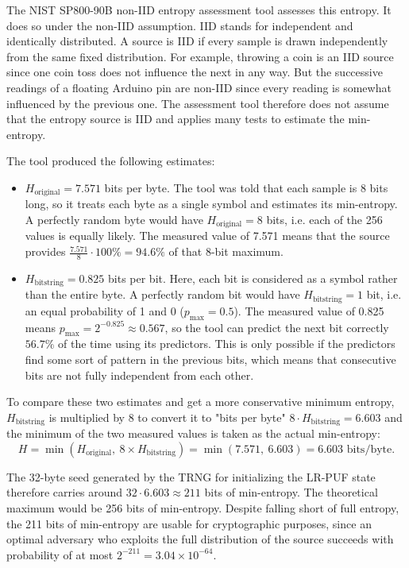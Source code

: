 The NIST SP800-90B non-IID entropy assessment tool assesses this entropy. It does so under the non-IID assumption. IID stands for independent and identically distributed. A source is IID if every sample is drawn independently from the same fixed distribution. For example, throwing a coin is an IID source since one coin toss does not influence the next in any way. But the successive readings of a floating Arduino pin are non-IID since every reading is somewhat influenced by the previous one. The assessment tool therefore does not assume that the entropy source is IID and applies many tests to estimate the min-entropy.

The tool produced the following estimates:
\begin{itemize}
    \item $H_\text{original}=7.571$ bits per byte. The tool was told that each sample is 8 bits long, so it treats each byte as a single symbol and estimates its min-entropy. A perfectly random byte would have $H_\text{original}=8$ bits, i.e. each of the 256 values is equally likely. The measured value of 7.571 means that the source provides   $\frac{7.571}{8}\cdot100\%=94.6\%$ of that 8-bit maximum.
    \item $H_\text{bitstring}=0.825$ bits per bit. Here, each bit is considered as a symbol rather than the entire byte. A perfectly random bit would have $H_\text{bitstring}=1$ bit, i.e. an equal probability of 1 and 0 ($p_{\max}=0.5$). The measured value of 0.825 means $p_{\max} = 2^{-0.825} \approx 0.567$, so the tool can predict the next bit correctly $56.7\%$ of the time using its predictors. This is only possible if the predictors find some sort of pattern in the previous bits, which means that consecutive bits are not fully independent from each other.    
\end{itemize}

To compare these two estimates and get a more conservative minimum entropy, $H_\text{bitstring}$ is multiplied by 8 to convert it to "bits per byte" $8\cdot H_\text{bitstring}=6.603$ and the minimum of the two measured values is taken as the actual min-entropy:
$$
H=  \min\!\left(H_\text{original},\ 8 \times H_\text{bitstring}\right) = \min(7.571,\ 6.603) = 6.603 \text{ bits/byte.}
$$


The 32-byte seed generated by the TRNG for initializing the LR-PUF state therefore carries around $32 \cdot 6.603 \approx 211$ bits of min-entropy. The theoretical maximum would be 256 bits of min-entropy. Despite falling short of full entropy, the 211 bits of min-entropy are usable for cryptographic purposes, since an optimal adversary who exploits the full distribution of the source succeeds with probability of at most $2^{-211}=3.04\times10^{-64}$.


